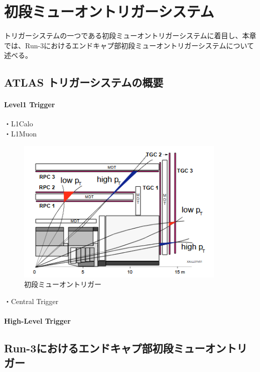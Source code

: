 \chapter{初段ミューオントリガーシステム}
トリガーシステムの一つである初段ミューオントリガーシステムに着目し、本章では、Run-3におけるエンドキャプ部初段ミューオントリガーシステムについて述べる。

\section{ATLAS トリガーシステムの概要}
\subsubsection{Level1 Trigger}
・L1Calo\\
・L1Muon\\
\begin{figure}[tb]
  \centering
  \includegraphics[clip, width=10cm]{fig/3/muon_trigger_overview.png}
  \caption{初段ミューオントリガー}
  \label{fig:muon}
\end{figure}

・Central Trigger
\subsubsection{High-Level Trigger}


\section{Run-3におけるエンドキャプ部初段ミューオントリガー}

